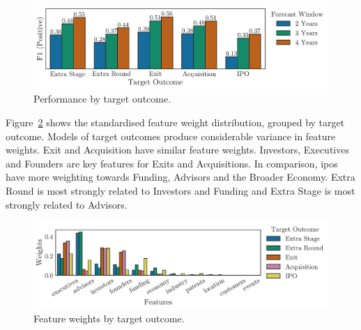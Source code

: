 \documentclass[../thesis/thesis.tex]{subfiles}
\begin{document}
\begin{figure}[!htb]
    \centering
    \includegraphics[width=\textwidth]{../figures/evaluation/performance_outcome}
    \caption[Performance by target outcome]{Performance by target outcome.}
    \label{fig:evaluation:f1_predictive_outcome}
\end{figure}

Figure~\ref{fig:evaluation:features_outcome} shows the standardised feature weight distribution, grouped by target outcome. Models of target outcomes produce considerable variance in feature weights. Exit and Acquisition have similar feature weights. Investors, Executives and Founders are key features for Exits and Acquisitions. In comparison, \gls{ipo}s have more weighting towards Funding, Advisors and the Broader Economy. Extra Round is most strongly related to Investors and Funding and Extra Stage is most strongly related to Advisors.

\begin{figure}[!htb]
    \centering
    \includegraphics[width=\textwidth]{../figures/evaluation/features_outcome}
    \caption[Feature weights by target outcome]{Feature weights by target outcome.}
    \label{fig:evaluation:features_outcome}
\end{figure}

\end{document}
